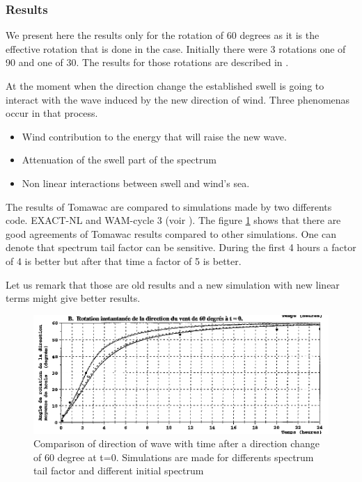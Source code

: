 \subsubsection{Results}
%
We present here the results only for the rotation of 60 degrees as it is the effective rotation that is done in the case. Initially there were 3 rotations one of 90 and one of 30. The results for those rotations are described in \cite{valid10TW}.

At the moment when the direction change the established swell is going to interact with the wave induced by the new direction of wind. Three phenomenas occur in that process.
\begin {itemize}
\item Wind contribution to the energy that will raise the new wave.
\item Attenuation of the swell part of the spectrum
\item Non linear interactions between swell and wind's sea.
\end{itemize}

The results of Tomawac are compared to simulations made by two differents code. EXACT-NL and WAM-cycle 3 (voir \cite{vledder}). The figure  \ref{resturnwind} shows that there are good agreements of Tomawac results compared to other simulations. One can denote that spectrum tail factor can be sensitive. During the first 4 hours a factor of 4 is better but after that time a factor of 5 is better.

Let us remark that those are old results and a new simulation with new linear terms might give better results.

\begin{figure} [!h]
\centering
\includegraphics[scale = 0.45]{resuTW60.png}
 \caption{Comparison of direction of wave with time after a direction change of 60 degree at t=0. Simulations are made for differents spectrum tail factor and different initial spectrum}
\label{resturnwind}
\end{figure}


